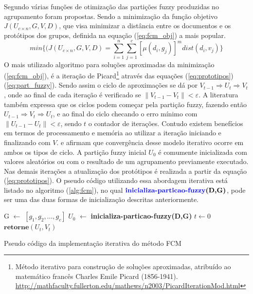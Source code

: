 Segundo \cite{Bezdek1984} várias funções de otimização das partições fuzzy produzidas no agrupamento
foram propostas. Sendo a minimização da função objetivo $J(U_{c \times n},G,V,D)$, 
que visa minimizar a distância entre os documentos e os protótipos dos grupos\cite{Nogueira2013}, 
definida na equação (\ref{eq:fcm_obj}) a mais popular.
\begin{equation}
  min\{(J(U_{c \times n},G,V,D) = \sum_{i=1}^n \sum_{j=1}^c [\mu(d_i, g_j)]^m dist(d_i, v_j)\}
  \label{eq:fcm_obj}
\end{equation}
O mais utilizado algoritmo para soluções aproximadas da minimização (\ref{eq:fcm_obj}), é a iteração
de Picard\footnote{Método iterativo para construção de soluções aproximadas, atribuído ao 
matemático francês Charles Emile Picard (1856-1941). 
\url{http://mathfaculty.fullerton.edu/mathews/n2003/PicardIterationMod.html}}\cite{Pal2005} 
através das equações (\ref{eq:prototipos})(\ref{eq:part_fuzzy}). Sendo assim  
o ciclo de aproximações se dá por $V_{t-1} \Rightarrow  U_t \Rightarrow  V_t$, onde ao final
de cada iteração é verificado se $\parallel V_{t-1} - V_t\parallel < \varepsilon$. 
A literatura também expressa que os ciclos podem começar pela partição fuzzy, fazendo então 
$U_{t-1} \Rightarrow  V_t \Rightarrow  U_t$, e ao final do ciclo checando o erro mínimo com 
$\parallel U_{t-1} - U_t\parallel < \varepsilon$, sendo $t$ o contador de iterações. 
Contudo existem benefícios em termos de processamento e memória ao utilizar a iteração iniciando
e finalizando com $V$\cite{Pal2005}.
\cite{Bezdek1984} e \cite{Pal2005} afirmam que convergência desse modelo iterativo ocorre
em ambos os tipos de ciclo.
A partição fuzzy inicial $U_0$ é comumente inicializada
com valores aleatórios\cite{Nogueira2013} ou com o resultado de um agrupamento previamente 
executado\cite{Pal2005}\cite{Krishnapuram1993}. Nas demais iterações a atualização dos protótipos é
realizada a partir da equação (\ref{eq:prototipos}). O pseudo código utilizando essa abordagem
iterativa está listado no algoritmo (\ref{alg:fcm}), no qual 
$\textbf{{\color{blue}inicializa-particao-fuzzy}(D,G)}$, pode ser uma das duas formas
de inicialização descritas anteriormente.

\begin{algorithm}[H]
\SetAlgoLined
{}
G $\gets$ $[g_1,g_2,...,g_c]$\;
$U_0$ $\gets$ \textbf{{\color{blue}inicializa-particao-fuzzy}(D,G)}\;
$t \gets 0$\;
$\textbf{retorne} (U_t, V_t)$\;
\caption{Pseudo código da implementação iterativa do método FCM}
\label{alg:fcm}
\end{algorithm}

